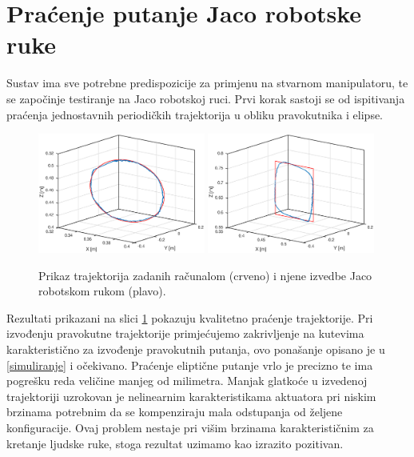 \documentclass[times, utf8, diplomski, numeric]{fer}
\begin{document}
\section{Praćenje putanje Jaco robotske ruke}\label{pracenje}
Sustav ima sve potrebne predispozicije za primjenu na stvarnom manipulatoru, te se započinje testiranje na Jaco robotskoj ruci.
Prvi korak sastoji se od ispitivanja praćenja jednostavnih periodičkih trajektorija u obliku pravokutnika i elipse.
\begin{figure}[H]
\centering
\includegraphics[width=0.49\textwidth]{jaco_elipsa}
\includegraphics[width=0.49\textwidth]{jaco_pravokutnik}
\caption{Prikaz trajektorija zadanih računalom (crveno) i njene izvedbe Jaco robotskom rukom (plavo).}
\label{fig:jacooblici}
\end{figure}

Rezultati prikazani na slici \ref{fig:jacooblici} pokazuju kvalitetno praćenje trajektorije.
Pri izvođenju pravokutne trajektorije primjećujemo zakrivljenje na kutevima karakteristično za izvođenje pravokutnih putanja, ovo ponašanje opisano je u \ref{simuliranje} i očekivano.
Praćenje eliptične putanje vrlo je precizno te ima pogrešku reda veličine manjeg od milimetra. 
Manjak glatkoće u izvedenoj trajektoriji uzrokovan je nelinearnim karakteristikama aktuatora pri niskim brzinama potrebnim da se kompenziraju mala odstupanja od željene konfiguracije.
Ovaj problem nestaje pri višim brzinama karakterističnim za kretanje ljudske ruke, stoga rezultat uzimamo kao izrazito pozitivan.
\end{document}
